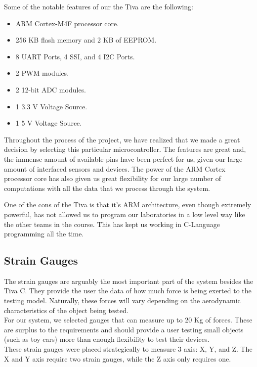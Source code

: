 		Some of the notable features of our the Tiva are the following:
		
		\begin{itemize}
		 \item ARM Cortex-M4F processor core.
		 \item 256 KB flash memory and 2 KB of EEPROM.
 		 \item 8 UART Ports, 4 SSI, and 4 I2C Ports.
 		 \item 2 PWM modules.
 		 \item 2 12-bit ADC modules.
 		 \item 1 3.3 V Voltage Source.
 		 \item 1 5 V Voltage Source.
        \end{itemize}
        
        Throughout the process of the project, we have realized that we made a great decision by selecting this particular microcontroller. The features are great and, the immense amount of available pins have been perfect for us, given our large amount of interfaced sensors and devices. The power of the ARM Cortex processor core has also given us great flexibility for our large number of computations with all the data that we process through the system. 
        
        One of the cons of the Tiva is that it's ARM architecture, even though extremely powerful, has not allowed us to program our laboratories in a low level way like the other teams in the course. This has kept us working in C-Language programming all the time. 
		
		
		\subsection{Strain Gauges}
		
		The strain gauges are arguably the most important part of the system besides the Tiva C. They provide the user the data of how much force is being exerted to the testing model. Naturally, these forces will vary depending on the aerodynamic characteristics of the object being tested. \\
		
		For our system, we selected gauges that can measure up to 20 Kg of forces. These are surplus to the requirements and should provide a user testing small objects (such as toy cars) more than enough flexibility to test their devices. \\
		
		These strain gauges were placed strategically to measure 3 axis: X, Y, and Z. The X and Y axis require two strain gauges, while the Z axis only requires one. \\
		
